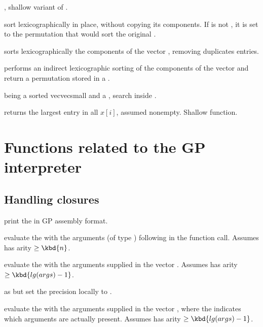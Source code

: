 , shallow variant of
.

 sort lexicographically
 in place, without copying its components. If
 is not , it is set to the permutation that would sort
the original .

 sorts lexicographically the components of
the vector , removing duplicates entries.

 performs an indirect lexicographic
sorting of the components of the vector  and return a permutation
stored in a .

  being a sorted
vecvecsmall and  a , search  inside .

 returns the largest entry in all $x[i]$,
assumed nonempty. Shallow function.

\newpage
\chapter{Functions related to the GP interpreter}

\section{Handling closures}\label{se:closure}


 print the   in
GP assembly format.

 evaluate the 
 with the  arguments (of type ) following  in
the function call. Assumes  has arity $\geq \kbd{n}$.

 evaluate the 
 with the arguments supplied in the vector . Assumes 
has arity $\geq \kbd{lg(args)-1}$.

 as
 but set the precision locally to .

 evaluate the 
 with the arguments supplied in the vector , where the 
 indicates which arguments are actually present.
Assumes  has arity $\geq \kbd{lg(args)-1}$.

